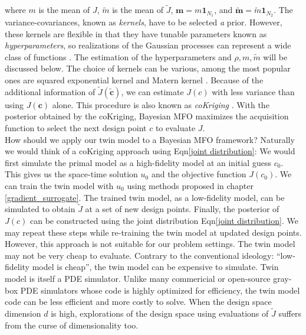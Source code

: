 \documentclass[a4paper,onecolumn]{article}
\theoremstyle{remark}
\begin{document}
where $m$ is the mean of $J$, $\tilde{m}$ is the mean of $\tilde{J}$, $\mathbf{m} =
m \mathbf{1}_{N_1}$, and $\mathbf{\tilde{m}} =\tilde{m}\mathbf{1}_{N_2}$.
The variance-covariances, known as \emph{kernels}, have to be selected \emph{a} prior.
However, these kernels are flexible in that they have tunable parameters known as
\emph{hyperparameters}, so realizations of the Gaussian processes
can represent a wide class of functions \cite{RKHS aronszajn}. 
The estimation of the hyperparameters and $\rho, m, \tilde{m}$ will be discussed below.
The choice of kernels can be various, among the most popular ones are
squared exponential kernel and Matern kernel \cite{practicalBayesianopt}.
Because of the additional information of $\tilde{J}(\tilde{\mathbf{c}})$, 
we can estimate
$J(c)$ with less variance than using $J(\mathbf{c})$ alone.
This procedure is also known as \emph{coKriging} \cite{cokriging}. 
With the posterior obtained by the coKriging, Bayesian MFO maximizes the acquisition
function to select the next design point $c$ to evaluate $J$.\\

\noindent How should we apply our twin model to a Bayesian MFO framework?
Naturally we would think of a coKriging approach using Eqn\eqref{joint distribution}:
We would first simulate the primal model as a high-fidelity model
at an initial guess $c_0$. 
This gives us the space-time solution $u_0$ and the objective function $J(c_0)$.
We can train the twin model with $u_0$ using methods proposed in chapter 
\ref{gradient_surrogate}. The trained twin model, as a low-fidelity model, 
can be simulated to obtain $\tilde{J}$ at a set of new design points.
Finally, the posterior of $J(c)$ can be constructed using the joint distribution
Eqn\eqref{joint distribution}. We may repeat these steps while re-training 
the twin model at updated design points.\\

\noindent However, this approach is not suitable for our problem settings.
The twin model may not be very cheap to evaluate. Contrary to the conventional
ideology: ``low-fidelity model is cheap'', the twin model can 
be expensive to simulate. Twin model is itself a PDE simulator.
Unlike many commericial or open-source gray-box PDE simulators whose code is highly optimized
for efficiency,
the twin model code can be less efficient and more costly to solve. When
the design space dimension $d$ is high, explorations of the design space
using evaluations of $\tilde{J}$ suffers from the curse of dimensionality too.\\
\end{document}
